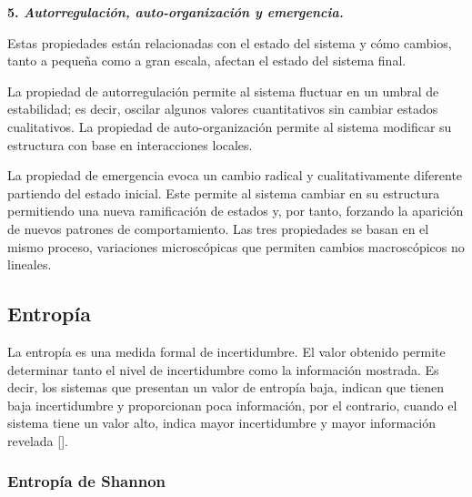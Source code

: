 \documentclass[../main.tex]{subfiles}
\begin{document}



\textbf{5. \textit{Autorregulación, auto-organización y emergencia.} }



Estas propiedades están relacionadas con el estado del sistema y cómo cambios, tanto a  pequeña como a gran escala, afectan el estado del sistema final.

La propiedad de autorregulación permite al sistema fluctuar en un umbral de estabilidad; es decir, oscilar algunos valores cuantitativos sin cambiar  estados cualitativos.
La propiedad de  auto-organización permite al sistema modificar su estructura con base en interacciones locales. 

La propiedad de emergencia evoca un cambio radical y cualitativamente diferente partiendo del estado inicial. Este permite al sistema cambiar en su estructura permitiendo una nueva ramificación de estados y, por tanto, forzando la aparición de nuevos patrones de comportamiento.  
Las tres propiedades se basan en el mismo proceso, variaciones microscópicas que permiten cambios macroscópicos no lineales.


\newline

\subsection{Entropía}



La entropía es una medida formal de incertidumbre. El valor obtenido permite determinar tanto el nivel de incertidumbre como la información mostrada. Es decir, los sistemas que presentan un valor de entropía baja, indican que tienen baja incertidumbre y proporcionan poca información, por el contrario, cuando el sistema tiene un valor alto, indica mayor incertidumbre y mayor información revelada [\cite{cochardt2019scott}].





\subsubsection{Entropía de Shannon}


\end{document}
